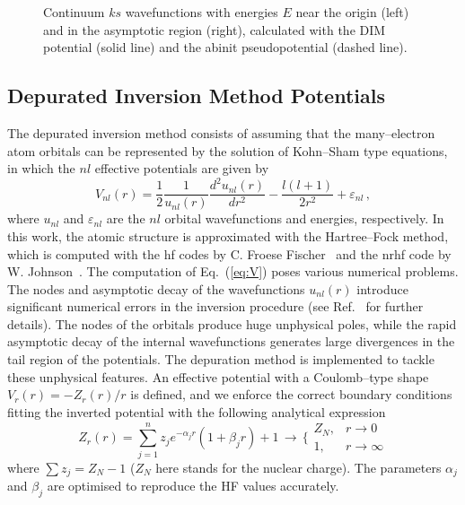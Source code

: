 \documentclass[10pt]{article}
\begin{document}
\begin{figure}[H]
 \caption{Continuum $ks$ wavefunctions with energies $E$ near the
 origin (left) and in the asymptotic region (right), calculated with
 the DIM potential (solid line) and the {\sc abinit} pseudopotential 
 (dashed line).}
 \label{fig:contLi}
\end{figure}

\subsection{Depurated Inversion Method Potentials}
\label{sec:DIM}

The depurated inversion method \cite{Mendez2015,Mendez2016,Mendez2018} 
consists of assuming that the many--electron atom orbitals can be 
represented by the solution of Kohn--Sham type equations, in which 
the $nl$ effective potentials are given by 
\begin{equation}
V_{nl}(r) = 
\frac{1}{2}\frac{1}{u_{nl}(r)}
\frac{d^2u_{nl}(r)}{dr^{2}} - 
\frac{l(l+1)}{2r^{2}}+\varepsilon_{nl} \, ,
\label{eq:V}
\end{equation}
where $u_{nl}$ and $\varepsilon_{nl}$ are the $nl$ orbital 
wavefunctions and energies, respectively. In this work, the atomic 
structure is approximated with the Hartree--Fock method, which is 
computed with the {\sc hf} codes by C. Froese 
Fischer~\cite{FroeseFischer1997} and the {\sc nrhf} code by 
W. Johnson~\cite{Johnson2007}. The computation of Eq.~(\ref{eq:V}) 
poses various numerical problems. The nodes and asymptotic decay of 
the wavefunctions $u_{nl}(r)$ introduce significant numerical errors 
in the inversion procedure (see Ref.~\cite{Mendez2018} for further 
details). The nodes of the orbitals produce huge unphysical poles, 
while the rapid asymptotic decay of the internal wavefunctions 
generates large divergences in the tail region of the potentials. 
The depuration method is implemented to tackle these unphysical 
features. An effective potential with a Coulomb--type shape 
$V_r(r)=-Z_r(r)/r$ is defined, and we enforce the correct boundary 
conditions fitting the inverted potential with the following 
analytical expression
\begin{equation}
 Z_r(r) = \sum_{j=1}^n z_j e^{-\alpha_j r}(1+\beta_jr) + 1
 \, \longrightarrow \, \bigg\{
 \begin{array}{cc}
  Z_N, & r\rightarrow0 \\
  1, & r\rightarrow\infty 
 \end{array}
 \label{eq:atomiczDIM}
\end{equation} 
where \mbox{$\sum z_j = Z_N-1$} ($Z_N$ here stands for the nuclear 
charge). The parameters $\alpha_j$ and $\beta_j$ are optimised to 
reproduce the HF values accurately. 
\end{document}
